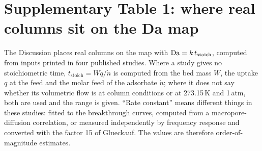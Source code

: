
\section*{Supplementary Table 1: where real columns sit on the Da map}

The Discussion places real columns on the map with $\mathrm{Da} = k\,t_{\mathrm{stoich}}$, computed from
inputs printed in four published studies. Where a study gives no stoichiometric time,
$t_{\mathrm{stoich}} = W q / \dot n$ is computed from the bed mass $W$, the uptake $q$ at the
feed and the molar feed of the adsorbate $\dot n$; where it does not say whether its volumetric
flow is at column conditions or at 273.15\,K and 1\,atm, both are used and the range is given.
``Rate constant'' means different things in these studies: fitted to the breakthrough curves,
computed from a macropore-diffusion correlation, or measured independently by frequency response
and converted with the factor 15 of Glueckauf. The values are therefore order-of-magnitude
estimates.

